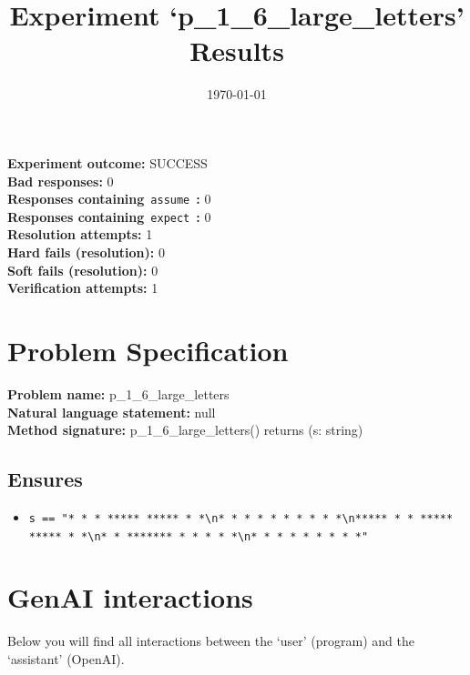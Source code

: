 \documentclass{article}
\begin{document}
\title{Experiment `p\_1\_6\_large\_letters' Results}
\author{\today}
\date{}
\maketitle
\textbf{Experiment outcome: }SUCCESS
\\\textbf{Bad responses: }0
\\\textbf{Responses containing}~\texttt{assume}~\textbf{: }0
\\\textbf{Responses containing}~\texttt{expect}~\textbf{: }0
\\\textbf{Resolution attempts: }1
\\\textbf{Hard fails (resolution): }0
\\\textbf{Soft fails (resolution): }0
\\\textbf{Verification attempts: }1
\section*{Problem Specification}
\textbf{Problem name: }p\_1\_6\_large\_letters
\\\textbf{Natural language statement: }null
\\\textbf{Method signature: }p\_1\_6\_large\_letters() returns (s: string)
\subsection*{Ensures}
\begin{itemize}
\item \texttt{s == "*   *      *      *****    *****    *     *\textbackslash{}n*   *     * *     *    *   *    *    *   *\textbackslash{}n*****    *   *    *****    *****      * *\textbackslash{}n*   *   *******   *    *   *    *      *\textbackslash{}n*   *  *       *  *     *  *     *     *"}
\end{itemize}
\clearpage
\section*{GenAI interactions}
Below you will find all interactions between the `user' (program) and the `assistant' (OpenAI).
\end{document}
